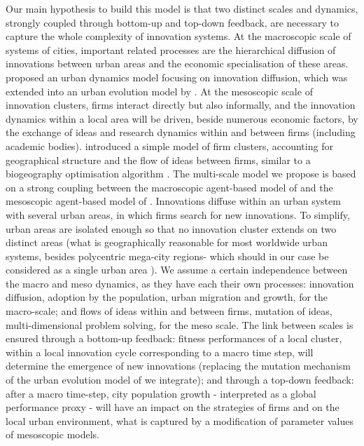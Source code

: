 \documentclass[letterpaper]{article}
\begin{document}
Our main hypothesis to build this model is that two distinct scales and dynamics, strongly coupled through bottom-up and top-down feedback, are necessary to capture the whole complexity of innovation systems. At the macroscopic scale of systems of cities, important related processes are the hierarchical diffusion of innovations between urban areas \citep{hagerstrand1968innovation} and the economic specialisation of these areas. \cite{favaro2011gibrat} proposed an urban dynamics model focusing on innovation diffusion, which was extended into an urban evolution model by \cite{raimbault2020model}. At the mesoscopic scale of innovation clusters, firms interact directly but also informally, and the innovation dynamics within a local area will be driven, beside numerous economic factors, by the exchange of ideas and research dynamics within and between firms (including academic bodies). \cite{raimbault2022innovation} introduced a simple model of firm clusters, accounting for geographical structure and the flow of ideas between firms, similar to a biogeography optimisation algorithm \citep{simon2008biogeography}. The multi-scale model we propose is based on a strong coupling between the macroscopic agent-based model of \cite{raimbault2020model} and the mesoscopic agent-based model of \cite{raimbault2022innovation}. Innovations diffuse within an urban system with several urban areas, in which firms search for new innovations. To simplify, urban areas are isolated enough so that no innovation cluster extends on two distinct areas (what is geographically reasonable for most worldwide urban systems, besides polycentric mega-city regions- which should in our case be considered as a single urban area \citep{yeh2020cities}). We assume a certain independence between the macro and meso dynamics, as they have each their own processes: innovation diffusion, adoption by the population, urban migration and growth, for the macro-scale; and flows of ideas within and between firms, mutation of ideas, multi-dimensional problem solving, for the meso scale. The link between scales is ensured through a bottom-up feedback: fitness performances of a local cluster, within a local innovation cycle corresponding to a macro time step, will determine the emergence of new innovations (replacing the mutation mechanism of the urban evolution model of \cite{raimbault2020model} we integrate); and through a top-down feedback: after a macro time-step, city population growth - interpreted as a global performance proxy - will have an impact on the strategies of firms and on the local urban environment, what is captured by a modification of parameter values of mesoscopic models.
\end{document}
